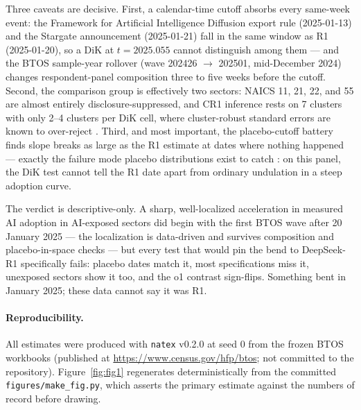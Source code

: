 \documentclass[11pt]{article}
\newcommand{\natex}{\texttt{natex}}
\begin{document}
Three caveats are decisive. First, a calendar-time cutoff absorbs every same-week
event: the Framework for Artificial Intelligence Diffusion export rule
(2025-01-13) and the Stargate announcement (2025-01-21) fall in the same window
as R1 (2025-01-20), so a DiK at $t=2025.055$ cannot distinguish among them ---
and the BTOS sample-year rollover (wave 202426 $\to$ 202501, mid-December
2024) changes respondent-panel composition three to five weeks before the
cutoff. Second, the comparison group is effectively two sectors: NAICS 11, 21,
22, and 55 are almost entirely disclosure-suppressed, and CR1 inference rests
on 7 clusters with only 2--4 clusters per DiK cell, where cluster-robust
standard errors are known to over-reject \cite{cameron2015}. Third, and most
important, the placebo-cutoff battery finds slope breaks as large as the R1
estimate at dates where nothing happened --- exactly the failure mode placebo
distributions exist to catch \cite{ganong2018}: on this panel, the DiK test
cannot tell the R1 date apart from ordinary undulation in a steep adoption
curve.

The verdict is descriptive-only. A sharp, well-localized acceleration in
measured AI adoption in AI-exposed sectors did begin with the first BTOS wave
after 20 January 2025 --- the localization is data-driven and survives
composition and placebo-in-space checks --- but every test that would pin the
bend to DeepSeek-R1 specifically fails: placebo dates match it, most
specifications miss it, unexposed sectors show it too, and the o1 contrast
sign-flips. Something bent in January 2025; these data cannot say it was R1.

\paragraph{Reproducibility.} All estimates were produced with \natex{} v0.2.0
\cite{natex} at seed 0 from the frozen BTOS workbooks (published at
\url{https://www.census.gov/hfp/btos}; not committed to the repository).
Figure~\ref{fig:fig1} regenerates deterministically from the committed
\texttt{figures/make\_fig.py}, which asserts the primary estimate against the
numbers of record before drawing.
\end{document}

